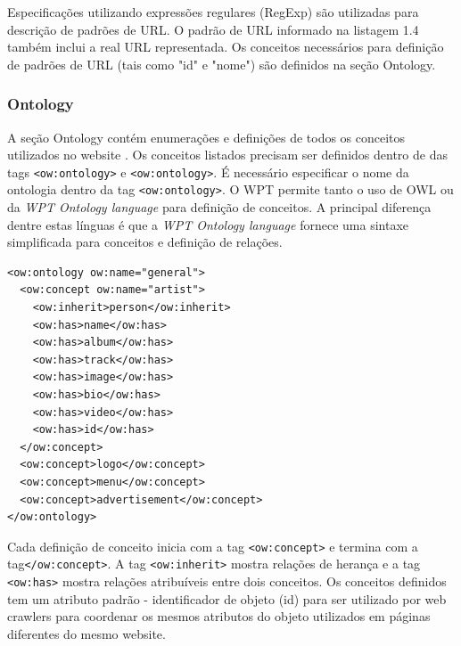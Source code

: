 Especificações utilizando expressões regulares (RegExp) são utilizadas para descrição de padrões de URL. O padrão de URL informado na listagem 1.4 também inclui a real URL representada. Os conceitos necessários para definição de padrões de URL (tais como "id" e "nome") são definidos na seção Ontology.

\subsubsection{Ontology}

A seção Ontology contém enumerações e definições de todos os conceitos utilizados no website \cite{wpt}. Os conceitos listados precisam ser definidos dentro de das tags \texttt{<ow:ontology>} e \texttt{<ow:ontology>}. É necessário especificar o nome da ontologia dentro da tag \texttt{<ow:ontology>}. O WPT permite tanto o uso de OWL ou da \emph{WPT Ontology language} para definição de conceitos. A principal diferença dentre estas línguas é que a \emph{WPT Ontology language} fornece uma sintaxe simplificada para conceitos e definição de relações.

\begin{lstlisting}
<ow:ontology ow:name="general">
  <ow:concept ow:name="artist">
    <ow:inherit>person</ow:inherit>
    <ow:has>name</ow:has>
    <ow:has>album</ow:has>
    <ow:has>track</ow:has>
    <ow:has>image</ow:has>
    <ow:has>bio</ow:has>
    <ow:has>video</ow:has>
    <ow:has>id</ow:has>
  </ow:concept>
  <ow:concept>logo</ow:concept>
  <ow:concept>menu</ow:concept>
  <ow:concept>advertisement</ow:concept>
</ow:ontology>
\end{lstlisting}

Cada definição de conceito inicia com a tag \texttt{<ow:concept>} e termina com a tag\texttt{</ow:concept>}. A tag \texttt{<ow:inherit>} mostra relações de herança e a tag \texttt{<ow:has>} mostra relações atribuíveis entre dois conceitos. Os conceitos definidos tem um atributo padrão - identificador de objeto (id) para ser utilizado por web crawlers para coordenar os mesmos atributos do objeto utilizados em páginas diferentes do mesmo website.
